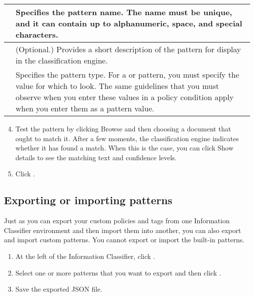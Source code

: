 \documentclass[letterpaper,10pt,english]{sphinxmanual}
\begin{document}
\begin{savenotes}\sphinxattablestart
\centering
\begin{tabulary}{\linewidth}[t]{|T|T|}
\hline

&
Specifies the pattern name. The name must be unique, and it can
contain up to alphanumeric, space, and special characters.
\\
\hline
{}
&
(Optional.) Provides a short description of the pattern for
display in the classification engine.
\\
\hline
{}
&
Specifies the pattern type.
For a  or  pattern, you must specify
the value for which to look. The same guidelines that you must
observe when you enter these values in a policy condition apply
when you enter them as a pattern value.
\\
\hline
\end{tabulary}
\par
\sphinxattableend\end{savenotes}
\begin{enumerate}
\setcounter{enumi}{3}
\item {} 
Test the pattern by clicking Browse and then choosing a document that ought to match it. After a few moments, the classification engine indicates whether it has found a match. When this is the case, you can click Show details to see the matching text and confidence levels.

\item {} 
Click .

\end{enumerate}


\subsection{Exporting or importing patterns}
\label{\detokenize{mcdmp_app_ug:exporting-or-importing-patterns}}
Just as you can export your custom policies and tags from one Information Classifier environment and then import them into another, you can also export and import custom patterns. You cannot export or import the built-in patterns.

\begin{enumerate}
\item {} 
At the left of the Information Classifier, click .

\item {} 
Select one or more patterns that you want to export and then click .

\item {} 
Save the exported JSON file.

\end{enumerate}
\end{document}
